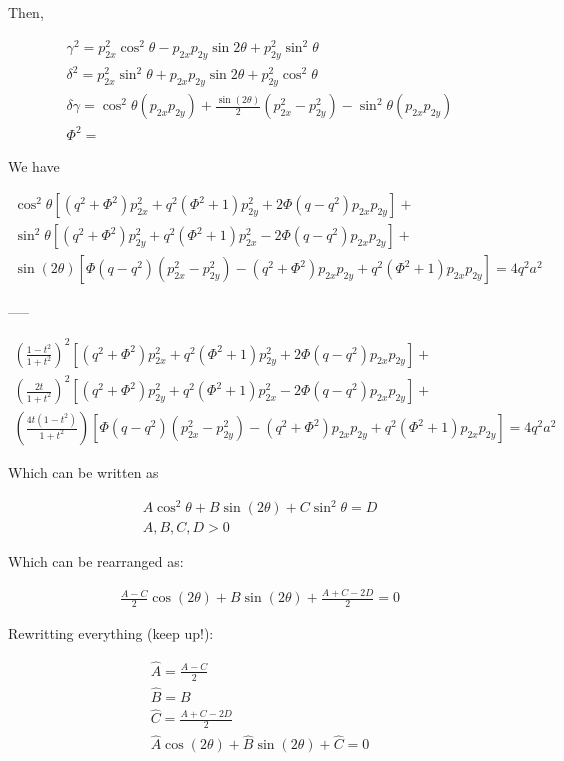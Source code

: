 \documentclass{article}
\begin{document}
Then,

\begin{eqnarray}
\gamma^2 = p_{2x}^2\cos^2{\theta} - p_{2x}p_{2y}\sin{2\theta} + p_{2y}^2\sin^2{\theta}\\
\delta^2 = p_{2x}^2\sin^2{\theta} + p_{2x}p_{2y}\sin{2\theta}+ p_{2y}^2\cos^2{\theta}\\
\delta\gamma = \cos^2{\theta}(p_{2x}p_{2y}) + \frac{\sin{(2\theta)}}{2}(p_{2x}^2 - p_{2y}^2) - \sin^2{\theta}(p_{2x}p_{2y})\\
\Phi^2=
\end{eqnarray}

We have

\begin{eqnarray*}
\cos^2{\theta}[(q^2+\Phi^2)p_{2x}^2 + q^2(\Phi^2+1)p_{2y}^2 + 2\Phi(q-q^2)p_{2x}p_{2y}]+\\
\sin^2{\theta}[(q^2+\Phi^2)p_{2y}^2 + q^2(\Phi^2+1)p_{2x}^2 - 2\Phi(q-q^2)p_{2x}p_{2y}]+\\
\sin{(2\theta)}[\Phi(q-q^2)(p_{2x}^2-p_{2y}^2) - (q^2+\Phi^2)p_{2x}p_{2y} + q^2(\Phi^2+1)p_{2x}p_{2y}]=4q^2a^2
\end{eqnarray*}

-----

\begin{eqnarray*}
	(\frac{1-t^2}{1+t^2})^2[(q^2+\Phi^2)p_{2x}^2 + q^2(\Phi^2+1)p_{2y}^2 + 2\Phi(q-q^2)p_{2x}p_{2y}]+\\
	(\frac{2t}{1+t^2})^2[(q^2+\Phi^2)p_{2y}^2 + q^2(\Phi^2+1)p_{2x}^2 - 2\Phi(q-q^2)p_{2x}p_{2y}]+\\
		(\frac{4t(1-t^2)}{1+t^2})[\Phi(q-q^2)(p_{2x}^2-p_{2y}^2) - (q^2+\Phi^2)p_{2x}p_{2y} + q^2(\Phi^2+1)p_{2x}p_{2y}]=4q^2a^2
\end{eqnarray*}


Which can be written as

\begin{eqnarray}
A\cos^2{\theta} + B\sin{(2\theta)} + C\sin^2{\theta} = D\\
A,B,C,D > 0
\end{eqnarray}

Which can be rearranged as:

\begin{eqnarray*}
\frac{A-C}{2}\cos{(2\theta)} + B\sin{(2\theta)} + \frac{A+C-2D}{2} = 0
\end{eqnarray*}

Rewritting everything (keep up!):

\begin{equation*}
\begin{split}
\hat{A}=\frac{A-C}{2}\\
\hat{B}=B\\
\hat{C}=\frac{A+C-2D}{2}\\
\hat{A} \cos{(2\theta)} + \hat{B}\sin{(2\theta)} + \hat{C} = 0
\end{split}
\end{equation*}
\end{document}
